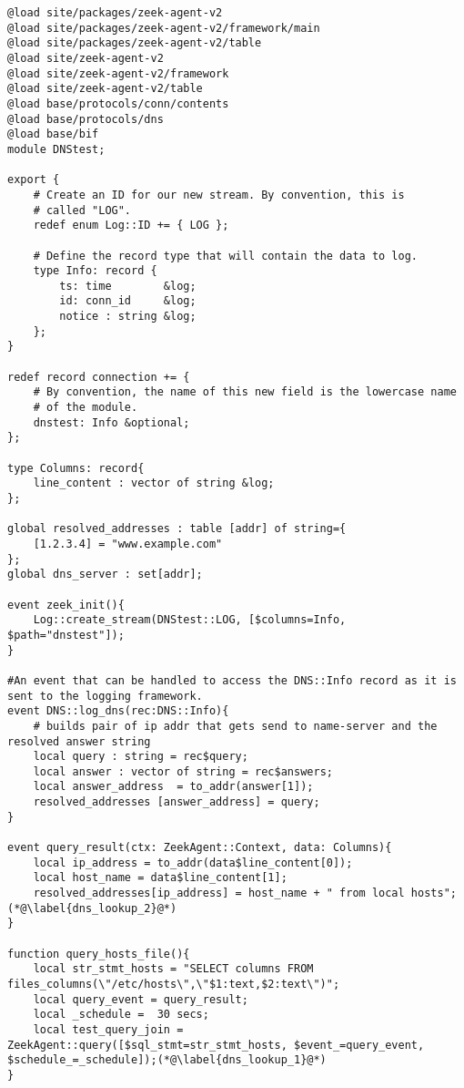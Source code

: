 \begin{lstlisting}[firstnumber=53,linerange={53-64,65-73},caption={Überprüfung der Verbindungsziele eines Endgerätes}]
@load site/packages/zeek-agent-v2
@load site/packages/zeek-agent-v2/framework/main
@load site/packages/zeek-agent-v2/table
@load site/zeek-agent-v2
@load site/zeek-agent-v2/framework
@load site/zeek-agent-v2/table
@load base/protocols/conn/contents
@load base/protocols/dns
@load base/bif
module DNStest;

export {
    # Create an ID for our new stream. By convention, this is
    # called "LOG".
    redef enum Log::ID += { LOG };

    # Define the record type that will contain the data to log.
    type Info: record {
        ts: time        &log;
        id: conn_id     &log; 
        notice : string &log;
    };
}   

redef record connection += {
    # By convention, the name of this new field is the lowercase name
    # of the module.
    dnstest: Info &optional;
};

type Columns: record{
    line_content : vector of string &log;
};

global resolved_addresses : table [addr] of string={
    [1.2.3.4] = "www.example.com"
};
global dns_server : set[addr];

event zeek_init(){
    Log::create_stream(DNStest::LOG, [$columns=Info, $path="dnstest"]);
}

#An event that can be handled to access the DNS::Info record as it is sent to the logging framework.
event DNS::log_dns(rec:DNS::Info){
    # builds pair of ip addr that gets send to name-server and the resolved answer string
    local query : string = rec$query;
    local answer : vector of string = rec$answers;
    local answer_address  = to_addr(answer[1]);
    resolved_addresses [answer_address] = query;
}

event query_result(ctx: ZeekAgent::Context, data: Columns){
    local ip_address = to_addr(data$line_content[0]);
    local host_name = data$line_content[1];
    resolved_addresses[ip_address] = host_name + " from local hosts";(*@\label{dns_lookup_2}@*)
}

function query_hosts_file(){
    local str_stmt_hosts = "SELECT columns FROM files_columns(\"/etc/hosts\",\"$1:text,$2:text\")";
    local query_event = query_result;
    local _schedule =  30 secs;
    local test_query_join = ZeekAgent::query([$sql_stmt=str_stmt_hosts, $event_=query_event, $schedule_=_schedule]);(*@\label{dns_lookup_1}@*)   
}


\end{lstlisting}
